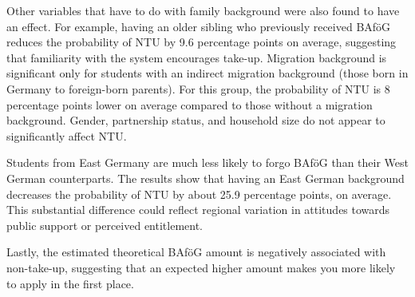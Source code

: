 
Other variables that have to do with family background were also found to have an effect. 
For example, having an older sibling who previously received BAföG reduces the probability of NTU by 9.6 percentage points on average, suggesting that familiarity with the system encourages take-up. 
Migration background is significant only for students with an indirect migration background (those born in Germany to foreign-born parents). 
For this group, the probability of NTU is 8 percentage points lower on average compared to those without a migration background.  
Gender, partnership status, and household size do not appear to significantly affect NTU.

Students from East Germany are much less likely to forgo BAföG than their West German counterparts. The results show that having an East German background decreases the probability of NTU by about 25.9 percentage points, on average. This substantial difference could reflect regional variation in attitudes towards public support or perceived entitlement.

Lastly, the estimated theoretical BAföG amount is negatively associated with non-take-up, suggesting that an expected higher amount makes you more likely to apply in the first place.


